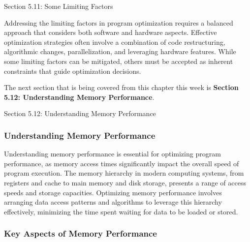 \begin{notes}{Section 5.11: Some Limiting Factors}
    \begin{highlight}
        Addressing the limiting factors in program optimization requires a balanced approach that considers both software and hardware aspects. Effective optimization strategies often involve a 
        combination of code restructuring, algorithmic changes, parallelization, and leveraging hardware features. While some limiting factors can be mitigated, others must be accepted as inherent 
        constraints that guide optimization decisions.
    \end{highlight}    
\end{notes}

The next section that is being covered from this chapter this week is \textbf{Section 5.12: Understanding Memory Performance}.

\begin{notes}{Section 5.12: Understanding Memory Performance}
    \subsubsection*{Understanding Memory Performance}

    Understanding memory performance is essential for optimizing program performance, as memory access times significantly impact the overall speed of program execution. The memory hierarchy in modern 
    computing systems, from registers and cache to main memory and disk storage, presents a range of access speeds and storage capacities. Optimizing memory performance involves arranging data access 
    patterns and algorithms to leverage this hierarchy effectively, minimizing the time spent waiting for data to be loaded or stored. \vspace*{1em}
    
    \subsubsection*{Key Aspects of Memory Performance}
    

\end{notes}
